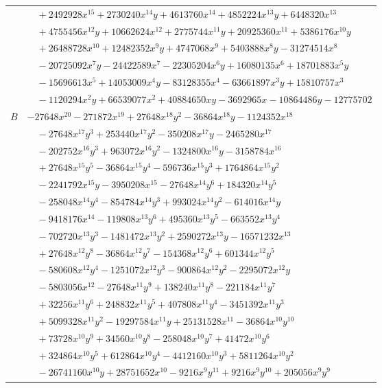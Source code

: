 \documentclass[11pt]{article}
\begin{document}
\begin{longtable}{@{}ll@{}}
 & $\quad +2492928x^{15}+2730240x^{14}y+4613760x^{14}+4852224x^{13}y+6448320x^{13}$\\
 & $\quad +4755456x^{12}y+10662624x^{12}+2775744x^{11}y+20925360x^{11}+5386176x^{10}y$\\
 & $\quad +26488728x^{10}+12482352x^{9}y+4747068x^{9}+5403888x^{8}y-31274514x^{8}$\\
 & $\quad -20725092x^{7}y-24422589x^{7}-22305204x^{6}y+16080135x^{6}+18701883x^{5}y$\\
 & $\quad -15696613x^{5}+14053009x^{4}y-83128355x^{4}-63661897x^{3}y+15810757x^{3}$\\
 & $\quad -1120294x^{2}y+66539077x^{2}+40884650xy-3692965x-10864486y-12775702$\\
$B$ & $-27648x^{20}-271872x^{19}+27648x^{18}y^{2}-36864x^{18}y-1124352x^{18}$\\
 & $\quad -27648x^{17}y^{3}+253440x^{17}y^{2}-350208x^{17}y-2465280x^{17}$\\
 & $\quad -202752x^{16}y^{3}+963072x^{16}y^{2}-1324800x^{16}y-3158784x^{16}$\\
 & $\quad +27648x^{15}y^{5}-36864x^{15}y^{4}-596736x^{15}y^{3}+1764864x^{15}y^{2}$\\
 & $\quad -2241792x^{15}y-3950208x^{15}-27648x^{14}y^{6}+184320x^{14}y^{5}$\\
 & $\quad -258048x^{14}y^{4}-854784x^{14}y^{3}+993024x^{14}y^{2}-614016x^{14}y$\\
 & $\quad -9418176x^{14}-119808x^{13}y^{6}+495360x^{13}y^{5}-663552x^{13}y^{4}$\\
 & $\quad -702720x^{13}y^{3}-1481472x^{13}y^{2}+2590272x^{13}y-16571232x^{13}$\\
 & $\quad +27648x^{12}y^{8}-36864x^{12}y^{7}-154368x^{12}y^{6}+601344x^{12}y^{5}$\\
 & $\quad -580608x^{12}y^{4}-1251072x^{12}y^{3}-900864x^{12}y^{2}-2295072x^{12}y$\\
 & $\quad -5803056x^{12}-27648x^{11}y^{9}+138240x^{11}y^{8}-221184x^{11}y^{7}$\\
 & $\quad +32256x^{11}y^{6}+248832x^{11}y^{5}+407808x^{11}y^{4}-3451392x^{11}y^{3}$\\
 & $\quad +5099328x^{11}y^{2}-19297584x^{11}y+25131528x^{11}-36864x^{10}y^{10}$\\
 & $\quad +73728x^{10}y^{9}+34560x^{10}y^{8}-258048x^{10}y^{7}+41472x^{10}y^{6}$\\
 & $\quad +324864x^{10}y^{5}+612864x^{10}y^{4}-4412160x^{10}y^{3}+5811264x^{10}y^{2}$\\
 & $\quad -26741160x^{10}y+28751652x^{10}-9216x^{9}y^{11}+9216x^{9}y^{10}+205056x^{9}y^{9}$\\

\end{longtable}
\end{document}
